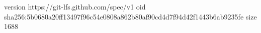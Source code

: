 version https://git-lfs.github.com/spec/v1
oid sha256:5b0680a20ff13497f96c54e0808a862b80af90cd4d7f94d42f1443b6ab9235fe
size 1688
